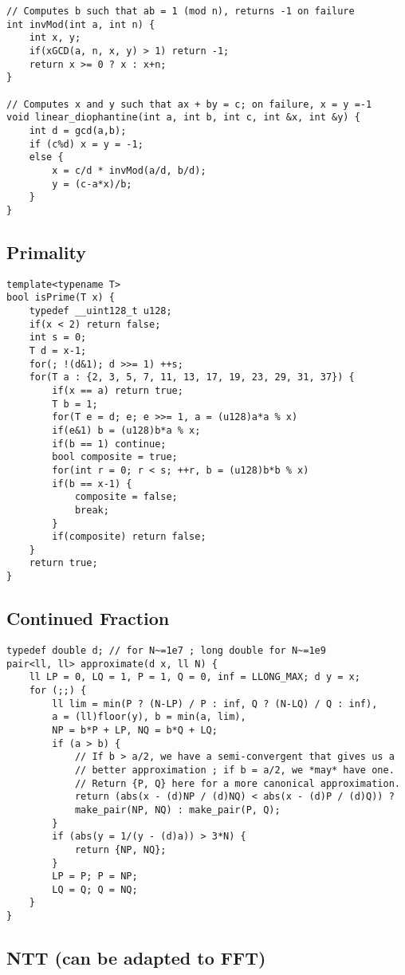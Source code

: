 \documentclass[a4paper,9pt]{article}
\begin{document}
\begin{lstlisting}
// Computes b such that ab = 1 (mod n), returns -1 on failure
int invMod(int a, int n) {
	int x, y;
	if(xGCD(a, n, x, y) > 1) return -1;
	return x >= 0 ? x : x+n;
}

// Computes x and y such that ax + by = c; on failure, x = y =-1
void linear_diophantine(int a, int b, int c, int &x, int &y) {
	int d = gcd(a,b);
	if (c%d) x = y = -1;
	else {
		x = c/d * invMod(a/d, b/d);
		y = (c-a*x)/b;
	}
}
\end{lstlisting}

\subsection{Primality}

\begin{lstlisting}
template<typename T>
bool isPrime(T x) {
	typedef __uint128_t u128;
	if(x < 2) return false;
	int s = 0;
	T d = x-1;
	for(; !(d&1); d >>= 1) ++s;
	for(T a : {2, 3, 5, 7, 11, 13, 17, 19, 23, 29, 31, 37}) {
		if(x == a) return true;
		T b = 1;
		for(T e = d; e; e >>= 1, a = (u128)a*a % x)
		if(e&1) b = (u128)b*a % x;
		if(b == 1) continue;
		bool composite = true;
		for(int r = 0; r < s; ++r, b = (u128)b*b % x)
		if(b == x-1) {
			composite = false;
			break;
		}
		if(composite) return false;
	}
	return true;
}
\end{lstlisting}

\subsection{Continued Fraction}

\begin{lstlisting}
typedef double d; // for N~=1e7 ; long double for N~=1e9
pair<ll, ll> approximate(d x, ll N) {
	ll LP = 0, LQ = 1, P = 1, Q = 0, inf = LLONG_MAX; d y = x;
	for (;;) {
		ll lim = min(P ? (N-LP) / P : inf, Q ? (N-LQ) / Q : inf),
		a = (ll)floor(y), b = min(a, lim),
		NP = b*P + LP, NQ = b*Q + LQ;
		if (a > b) {
			// If b > a/2, we have a semi-convergent that gives us a
			// better approximation ; if b = a/2, we *may* have one.
			// Return {P, Q} here for a more canonical approximation.
			return (abs(x - (d)NP / (d)NQ) < abs(x - (d)P / (d)Q)) ?
			make_pair(NP, NQ) : make_pair(P, Q);
		}
		if (abs(y = 1/(y - (d)a)) > 3*N) {
			return {NP, NQ};
		}
		LP = P; P = NP;
		LQ = Q; Q = NQ;
	}
}
\end{lstlisting}

\subsection{NTT (can be adapted to FFT)}
\end{document}
